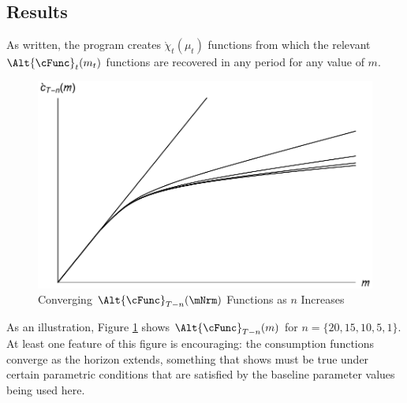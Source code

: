 \documentclass[titlepage, headings=optiontotocandhead]{\econtex}
\begin{document}
\subsection{Results}

As written, the program creates \texttt{$\grave{\chi}_{t}(\mu_{t})$}
functions from which the relevant $\Alt{\cFunc}_{t}({m}_{t})$
functions are recovered in any period for any value of ${m}$.

\hypertarget{PlotCFuncsConverge}{}
\begin{figure}
  \includegraphics{./Figures/PlotCFuncsConverge}
  \caption{Converging $\Alt{\cFunc}_{T-n}({\mNrm})$ Functions as $n$ Increases}
  \label{fig:PlotCFuncsConverge}
\end{figure}


As an illustration, Figure \ref{fig:PlotCFuncsConverge} shows
$\Alt{\cFunc}_{T-n}({m})$ for $n=\{20,15,10,5,1\}$.  At least one
feature of this figure is encouraging: the consumption functions
converge as the horizon extends, something that \cite{BufferStockTheory}
shows must be true under certain parametric conditions that are
satisfied by the baseline parameter values being used here.
\end{document}
